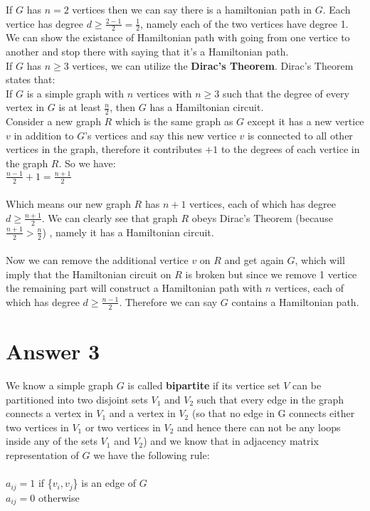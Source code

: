 \documentclass[11pt]{article}
\begin{document}
If $G$ has $n = 2$ vertices then we can say there is a hamiltonian path in $G$. Each vertice has degree $d \geq \frac{2-1}{2} =\frac{1}{2}$, namely each of the two vertices have degree 1. We can show the existance of Hamiltonian path with going from one vertice to another and stop there with saying that it's a Hamiltonian path.\\

If $G$ has $n\geq 3$ vertices, we can utilize the \textbf{Dirac's Theorem}. Dirac's Theorem states that:\\
If $G$ is a simple graph with $n$ vertices with $n\geq 3$ such that the degree of every vertex in $G$ is at least $\frac{n}{2}$, then $G$ has a Hamiltonian circuit.\\

Consider a new graph $R$ which is the same graph as $G$ except it has a new vertice $v$ in addition to $G$'s vertices and say this new vertice $v$ is connected to all other vertices in the graph, therefore it contributes $+1$ to the degrees of each vertice in the graph $R$. So we have:\\

$\frac{n-1}{2} + 1 = \frac{n+1}{2}$\\\\ Which means our new graph $R$ has $n+1$ vertices, each of which has degree $d \geq \frac{n+1}{2}$. We can clearly see that graph $R$ obeys Dirac's Theorem (because $\frac{n+1}{2} > \frac{n}{2}$) , namely it has a Hamiltonian circuit.\\\\
Now we can remove the additional vertice $v$ on $R$ and get again $G$, which will imply that the Hamiltonian circuit on $R$ is broken but since we remove 1 vertice the remaining part will construct a Hamiltonian path with $n$ vertices, each of which has degree $d \geq \frac{n-1}{2}$. Therefore we can say $G$ contains a Hamiltonian path.\\

\section*{Answer 3}
We know a simple graph $G$ is called \textbf{bipartite} if its vertice set $V$ can be partitioned into two disjoint sets $V_1$ and $V_2$ such that every edge in the graph connects a vertex in $V_1$ and a vertex in $V_2$ (so that no edge in G connects either two vertices in $V_1$ or two vertices in $V_2$ and hence there can not be any loops inside any of the sets $V_1$ and $V_2$) and we know that in adjacency matrix representation of $G$ we have the following rule:\\\\
$a_{ij} = 1$ if \{$v_i,v_j$\} is an edge of $G$\\
$a_{ij} = 0$ otherwise\\
\end{document}
